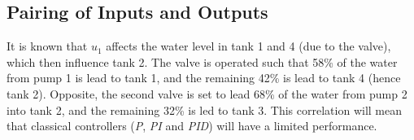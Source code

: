 \subsection{Pairing of Inputs and Outputs}
It is known that $u_1$ affects the water level in tank 1 and 4 (due to the valve), which then influence tank 2. The valve is operated such that 58\% of the water from pump 1 is lead to tank 1, and the remaining 42\% is lead to tank 4 (hence tank 2). Opposite, the second valve is set to lead 68\% of the water from pump 2 into tank 2, and the remaining 32\% is led to tank 3. This correlation will mean that classical controllers (\textit{P}, \textit{PI} and \textit{PID}) will have a limited performance.